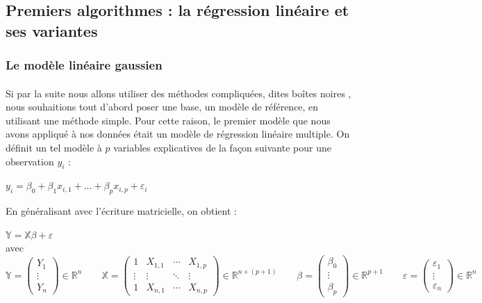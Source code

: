 \documentclass[14pt, openany]{article}
\begin{document}
\subsection{Premiers algorithmes : la régression linéaire et ses variantes}
\subsubsection{Le modèle linéaire gaussien}
\paragraph{}
Si par la suite nous allons utiliser des méthodes compliquées, dites \og boîtes noires \fg{} , nous souhaitions tout d'abord poser une base, un modèle de référence, en utilisant une méthode simple. Pour cette raison, le premier modèle que nous avons appliqué à nos données était un modèle de régression linéaire multiple. On définit un tel modèle à $p$ variables explicatives de la façon suivante pour une observation $y_i$ :
\begin{center}
$y_{i}=\beta_{0}+\beta_{1}x_{i,1}+...+\beta_{p}x_{i,p}+\varepsilon_{i}$
\end{center}
En généralisant avec l'écriture matricielle, on obtient :
\begin{center}
$\mathbb{Y}=\mathbb{X}\beta+\varepsilon$\\
\bigskip
avec $\mathbb{Y} = \begin{pmatrix} Y_1 \\ \vdots \\ Y_n \end{pmatrix} \in \mathbb{R}^n \qquad\mathbb{X} = \begin{pmatrix} 1 & X_{1,1} & \cdots & X_{1,p} \\ \vdots & \vdots & \ddots & \vdots \\ 1 & X_{n,1} & \cdots & X_{n,p} \end{pmatrix} \in \mathbb{R}^{n\times(p+1)} \qquad \mathbb{\beta} = \begin{pmatrix} \beta_0 \\ \vdots \\ \beta_p \end{pmatrix} \in \mathbb{R}^{p+1}\qquad \varepsilon = \begin{pmatrix} \varepsilon_1 \\ \vdots \\ \varepsilon_n \end{pmatrix} \in \mathbb{R}^n$\\
\end{center}
\end{document}
